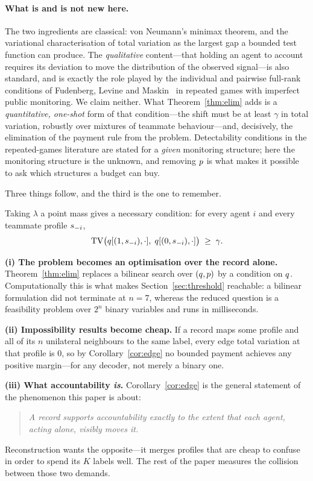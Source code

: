 \paragraph{What is and is not new here.}
The two ingredients are classical: von Neumann's minimax theorem, and the
variational characterisation of total variation as the largest gap a bounded
test function can produce. The \emph{qualitative} content---that holding an
agent to account requires its deviation to move the distribution of the observed
signal---is also standard, and is exactly the role played by the individual and
pairwise full-rank conditions of Fudenberg, Levine and
Maskin~\cite{flm1994} in repeated games with imperfect public monitoring. We
claim neither. What Theorem~\ref{thm:elim} adds is a \emph{quantitative,
one-shot} form of that condition---the shift must be at least $\gamma$ in total
variation, robustly over mixtures of teammate behaviour---and, decisively, the
elimination of the payment rule from the problem. Detectability conditions in the
repeated-games literature are stated for a \emph{given} monitoring structure;
here the monitoring structure is the unknown, and removing $p$ is what makes
it possible to ask which structures a budget can buy.

Three things follow, and the third is the one to remember.

\begin{corollary}
\label{cor:edge}
Taking $\lambda$ a point mass gives a necessary condition: for every agent $i$
and every teammate profile $s_{-i}$,
\[
  \mathrm{TV}\bigl(q[(1,s_{-i}),\cdot],\; q[(0,s_{-i}),\cdot]\bigr)
  \;\ge\; \gamma .
\]
\end{corollary}

\noindent\textbf{(i) The problem becomes an optimisation over the record alone.}
Theorem~\ref{thm:elim} replaces a bilinear search over $(q, p)$ by a
condition on $q$. Computationally this is what makes
Section~\ref{sec:threshold} reachable: a bilinear formulation did not terminate
at $n = 7$, whereas the reduced question is a feasibility problem over $2^n$
binary variables and runs in milliseconds.

\noindent\textbf{(ii) Impossibility results become cheap.}
If a record maps some profile and all of its $n$ unilateral neighbours to the
same label, every edge total variation at that profile is $0$, so by
Corollary~\ref{cor:edge} no bounded payment achieves any positive margin---for
any decoder, not merely a binary one.

\noindent\textbf{(iii) What accountability \emph{is}.}
Corollary~\ref{cor:edge} is the general statement of the phenomenon this paper
is about:
\begin{quote}
\emph{A record supports accountability exactly to the extent that each agent,
acting alone, visibly moves it.}
\end{quote}
Reconstruction wants the opposite---it merges profiles that are cheap to confuse
in order to spend its $K$ labels well. The rest of the paper measures the
collision between those two demands.

